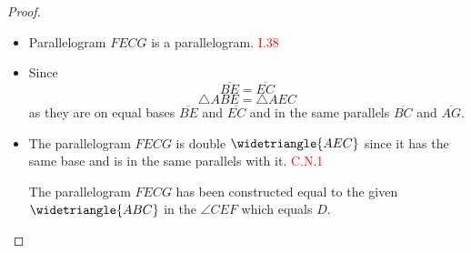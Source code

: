 \begin{figure}[H]
	\begin{subfigure}{0.4\textwidth}
		\caption{}
	\end{subfigure}
	\begin{subfigure}{0.4\textwidth}
		\caption{}
	\end{subfigure}
	\begin{subfigure}{0.4\textwidth}
		\caption{}
	\end{subfigure}
	\caption{}
\end{figure}

\begin{proof}

\begin{itemize}

\item Parallelogram $FECG$ is a parallelogram. \hfill\textcolor{red}{I.38}

\item Since 
\[\overline{BE} = \overline{EC}\] 
\[\triangle{ABE} = \triangle{AEC} \]
as they are on equal bases $\overline{BE}$ and $\overline{EC}$ and in the same parallels $\overline{BC}$ and $\overline{AG}$.%

\item The parallelogram $FECG$ is double $\widetriangle{AEC}$ since it has the same base and is in the same parallels with it. \hfill\textcolor{red}{C.N.1}

The parallelogram $FECG$ has been constructed equal to the given $\widetriangle{ABC}$ in the $\angle{CEF}$ which equals $D$.

\end{itemize}

\end{proof}

\clearpage
